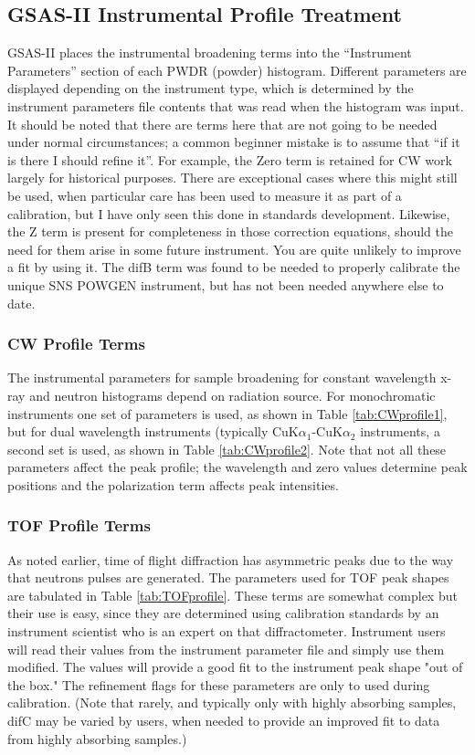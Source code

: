 \subsection{GSAS-II Instrumental Profile Treatment}

GSAS-II places the instrumental broadening terms into the “Instrument Parameters” section of each PWDR (powder) histogram. Different parameters are displayed depending on the instrument type, which is 
determined by the instrument parameters file contents that was read when the histogram was input. It should be 
noted that there are terms here that are not going to be needed under normal circumstances; a common beginner mistake is to assume that ``if it is there I should refine it''. For example, the 
Zero term is retained for CW work largely for historical purposes. There are exceptional cases where this might still be used, when particular care has been used to measure it as part of a calibration, but I have only seen this done in standards development. 
Likewise, the Z term is present for completeness in those correction equations, should the need for them arise in some future instrument. You are quite unlikely to improve a fit by using it. The difB term was found to be needed to properly calibrate the unique SNS POWGEN instrument, but has not been needed anywhere else to date.

\subsubsection{CW Profile Terms}

The instrumental parameters for sample broadening for constant wavelength x-ray and neutron histograms depend on radiation source. For monochromatic instruments one set of parameters is used, as shown in Table \ref{tab:CWprofile1}, but for dual wavelength instruments (typically CuK$\alpha_1$-CuK$\alpha_2$ instruments, a second set is used, as shown in Table \ref{tab:CWprofile2}. Note that not all these parameters affect the peak profile; the wavelength and zero values determine peak positions and the polarization term affects peak intensities.


\subsubsection{TOF Profile Terms}

As noted earlier, time of flight diffraction has asymmetric peaks due to the way that neutrons pulses are generated. 
The parameters used for TOF peak shapes are tabulated in Table \ref{tab:TOFprofile}. 
These terms are somewhat complex but their use is easy, since they are determined using calibration standards by an instrument scientist who is an expert on that diffractometer. Instrument users will read their values from the instrument parameter file and simply use them modified. The values will provide a good fit to the instrument peak shape "out of the box."
The refinement flags for these parameters are only to used during calibration.
(Note that rarely, and typically only with highly absorbing samples, difC may be varied by users, when needed to provide an improved fit to data from highly absorbing samples.)

